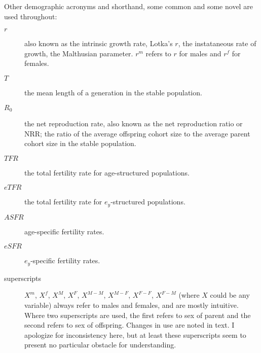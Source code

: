 Other demographic acronyms and shorthand, some common and some novel are used
throughout:
\begin{description}
  \item[$r$] also known as the intrinsic growth rate, Lotka's $r$, the
  instataneous rate of growth, the Malthusian parameter. $r^m$ refers to $r$ for
  males and $r^f$ for females.
  \item [$T$] the mean length of a generation in the stable population.
  \item [$R_0$] the net reproduction rate, also known as the net reproduction
  ratio or NRR; the ratio of the average offspring cohort size to the average
  parent cohort size in the stable population.
  \item [$TFR$] the total fertility rate for age-structured populations.
  \item [$eTFR$] the total fertility rate for $e_y$-structured populations.
  \item [$ASFR$] age-specific fertility rates.
  \item [$eSFR$] $e_y$-specific fertility rates.
  \item [superscripts] ${X}^m$, ${X}^f$, ${X}^M$, ${X}^F$, ${X}^{M-M}$,
  ${X}^{M-F}$, ${X}^{F-F}$, ${X}^{F-M}$ (where $X$ could be any variable) always
  refer to males and females, and are mostly intuitive. Where two
  superscripts are used, the first refers to sex of parent and the second
  refers to sex of offspring. Changes in use are noted in text. I apologize for
  inconsistency here, but at least these superscripts seem to present no
  particular obstacle for understanding.
\end{description}
